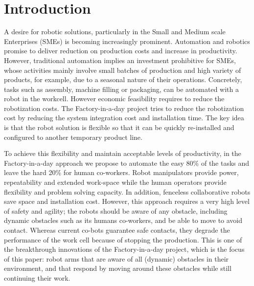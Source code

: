 
\section{Introduction}

A desire for robotic solutions, particularly in the Small and Medium scale
Enterprises (SMEs) is becoming increasingly prominent. Automation and robotics
promise to deliver reduction on production costs and increase in productivity.
However, traditional automation implies an investment prohibitive for SMEs,
whose activities mainly involve small batches of production and high variety of
products, for example, due to a seasonal nature of their operations.
Concretely, tasks such as assembly, machine filling or packaging, can be
automated with a robot in the workcell. However economic feasibility requires to
reduce the robotization costs. The Factory-in-a-day project \cite{fiad} tries to reduce the
robotization cost by reducing the system integration cost and installation time.
The key idea is that the robot solution is flexible so that it can be quickly
re-installed and configured to another temporary product line.


To achieve this flexibility and maintain acceptable levels of productivity, in
the Factory-in-a-day approach we propose to automate the easy 80\% of the tasks
and leave the hard 20\% for human co-workers. Robot manipulators provide power,
repeatability and extended work-space while the human operators provide
flexibility and problem solving capacity. In addition, fenceless collaborative
robots save space and installation cost. However, this approach requires a very
high level of safety and agility; the robots should be aware of any obstacle,
including dynamic obstacles such as its humans co-workers, and be able to move
to avoid contact. Whereas current co-bots guarantee safe contacts, they degrade
the performance of the work cell because of stopping the production. This is one
of the breakthrough innovations of the Factory-in-a-day project, which is the
focus of this paper: robot arms that are aware of all (dynamic) obstacles in
their environment, and that respond by moving around these obstacles while
still continuing their work. 




